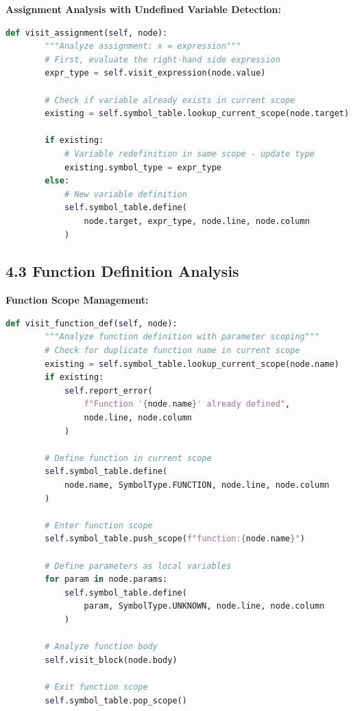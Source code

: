 \documentclass[a4paper,11pt]{article}
\begin{document}
    \textbf{Assignment Analysis with Undefined Variable Detection:}

    \begin{lstlisting}[language=Python, caption=Assignment Visitor]
    def visit_assignment(self, node):
        """Analyze assignment: x = expression"""
        # First, evaluate the right-hand side expression
        expr_type = self.visit_expression(node.value)
        
        # Check if variable already exists in current scope
        existing = self.symbol_table.lookup_current_scope(node.target)
        
        if existing:
            # Variable redefinition in same scope - update type
            existing.symbol_type = expr_type
        else:
            # New variable definition
            self.symbol_table.define(
                node.target, expr_type, node.line, node.column
            )
    \end{lstlisting}

    \subsection{4.3 Function Definition Analysis}

    \textbf{Function Scope Management:}

    \begin{lstlisting}[language=Python, caption=Function Definition Visitor]
    def visit_function_def(self, node):
        """Analyze function definition with parameter scoping"""
        # Check for duplicate function name in current scope
        existing = self.symbol_table.lookup_current_scope(node.name)
        if existing:
            self.report_error(
                f"Function '{node.name}' already defined",
                node.line, node.column
            )
        
        # Define function in current scope
        self.symbol_table.define(
            node.name, SymbolType.FUNCTION, node.line, node.column
        )
        
        # Enter function scope
        self.symbol_table.push_scope(f"function:{node.name}")
        
        # Define parameters as local variables
        for param in node.params:
            self.symbol_table.define(
                param, SymbolType.UNKNOWN, node.line, node.column
            )
        
        # Analyze function body
        self.visit_block(node.body)
        
        # Exit function scope
        self.symbol_table.pop_scope()
    \end{lstlisting}
\end{document}
